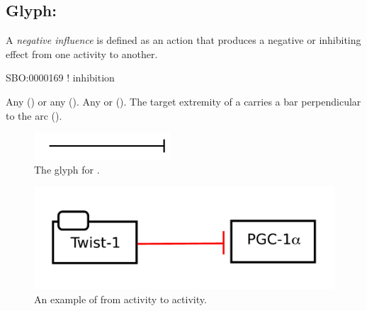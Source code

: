 \subsection{Glyph: }
\label{sec:af:negative_infl}

A \emph{negative influence} is defined as an action that produces a negative or inhibiting effect from one activity to another.

\begin{glyphDescription}

\glyphSboTerm SBO:0000169 ! inhibition

 \glyphOrigin Any  () or any  ().
 \glyphTarget Any  or  ().
 \glyphEndPoint The target extremity of a  carries a bar perpendicular to the arc ().

\end{glyphDescription}

\begin{figure}[H]
  \centering
  \includegraphics[width = 2in]{images/negativeInfluence}
  \caption{The \AF glyph for .}
  \label{fig:af:negativeInfl}
\end{figure}

\begin{figure}[H]
  \centering
  \includegraphics[width = 5in]{examples/ex-negativeInfluence}
  \caption{An example of  from  activity to  activity.}
  \label{fig:af:ex-NI}
\end{figure} 